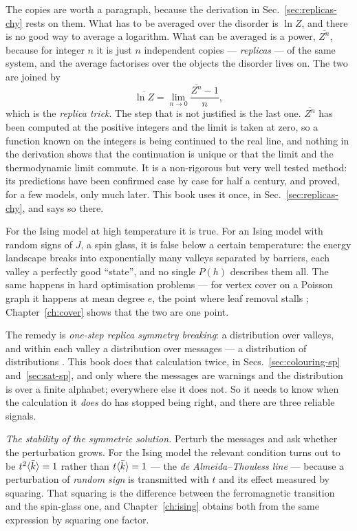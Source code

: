 The copies are worth a paragraph, because the derivation in
Sec.~\ref{sec:replicas-chy} rests on them. What has to be averaged over the
disorder is $\ln Z$, and there is no good way to average a logarithm. What can
be averaged is a power, $\overline{Z^{n}}$, because for integer $n$ it is just
$n$ independent copies --- \emph{replicas} --- of the same system, and the
average factorises over the objects the disorder lives on. The two are joined by
\begin{equation}
  \overline{\ln Z}=\lim_{n\to0}\frac{\overline{Z^{n}}-1}{n},
  \label{eq:replicatrick}
\end{equation}
which is the \emph{replica trick}. The step that is not justified is the last
one. $\overline{Z^{n}}$ has been computed at the positive integers and the limit
is taken at zero, so a function known on the integers is being continued to the
real line, and nothing in the derivation shows that the continuation is unique
or that the limit and the thermodynamic limit commute. It is a non-rigorous but
very well tested method: its predictions have been confirmed case by case for
half a century, and proved, for a few models, only much later. This book uses it
once, in Sec.~\ref{sec:replicas-chy}, and says so there.

For the Ising model at high temperature it is true. For an Ising model with
random signs of $J$, a spin glass, it is false below a certain temperature: the
energy landscape breaks into exponentially many valleys separated by barriers,
each valley a perfectly good ``state'', and no single $P(h)$ describes them all.
The same happens in hard optimisation problems --- for vertex cover on a Poisson
graph it happens at mean degree $e$, the point where leaf removal stalls
\citep{weigt2000,bauer2001}; Chapter~\ref{ch:cover} shows that the two are one
point.

The remedy is \emph{one-step replica symmetry breaking}: a distribution over
valleys, and within each valley a distribution over messages --- a distribution
of distributions \citep{mezard2001}. This book does that calculation twice, in
Secs.~\ref{sec:colouring-sp} and~\ref{sec:sat-sp}, and only where the messages
are warnings and the distribution is over a finite alphabet; everywhere else it
does not. So it needs to know when the calculation it \emph{does} do has
stopped being right, and there are three reliable signals.

\emph{The stability of the symmetric solution.} Perturb the messages and ask
whether the perturbation grows. For the Ising model the relevant condition turns
out to be $t^{2}\langle \bar k \rangle=1$ rather than $t\langle \bar k \rangle=1$ --- the
\emph{de Almeida--Thouless line} \citep{dealmeida1978} --- because a perturbation
of \emph{random sign} is transmitted with $t$ and its effect measured by
squaring. That squaring is the difference between the ferromagnetic
transition and the spin-glass one, and Chapter~\ref{ch:ising} obtains both from
the same expression by squaring one factor.

